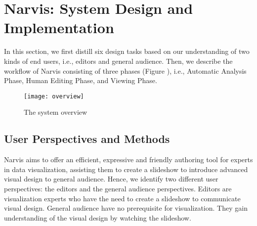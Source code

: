
\section{Narvis: System Design and Implementation}


In this section, we first distill six design tasks based on our understanding of two kinds of end users, i.e., editors and general audience. Then, we describe the workflow of Narvis consisting of three phases (Figure ), i.e., Automatic Analysis Phase, Human Editing Phase, and Viewing Phase.


\begin{figure}
 \centering %
 \texttt{[image: overview]}
 \caption{The system overview}
 \label{fig:overview}
\end{figure}

\subsection{User Perspectives and Methods}

Narvis aims to offer an efficient, expressive and friendly authoring tool for experts in data visualization, assisting them to create a slideshow to introduce advanced visual design to general audience.  
Hence, we identify two different user perspectives: the editors and the general audience perspectives. Editors are visualization experts who have the need to create a slideshow to communicate visual design. General audience have no prerequisite for visualization. They gain understanding of the visual design by watching the slideshow. 

